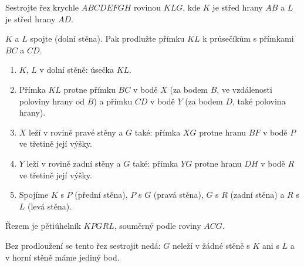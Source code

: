 \begin{problem}
  Sestrojte řez krychle $ABCDEFGH$ rovinou $KLG$, kde $K$ je střed hrany $AB$ a $L$ je střed hrany $AD$.
\end{problem}

\begin{hint}
  $K$ a $L$ spojte (dolní stěna). Pak prodlužte přímku $KL$ k průsečíkům s přímkami $BC$ a $CD$.
\end{hint}

\begin{solution}
  \begin{enumerate}
    \item $K$, $L$ v dolní stěně: úsečka $KL$.
    \item Přímka $KL$ protne přímku $BC$ v bodě $X$ (za bodem $B$, ve vzdálenosti poloviny hrany od $B$) a přímku $CD$ v bodě $Y$ (za bodem $D$, také polovina hrany).
    \item $X$ leží v rovině pravé stěny a $G$ také: přímka $XG$ protne hranu $BF$ v bodě $P$ ve třetině její výšky.
    \item $Y$ leží v rovině zadní stěny a $G$ také: přímka $YG$ protne hranu $DH$ v bodě $R$ ve třetině její výšky.
    \item Spojíme $K$ s $P$ (přední stěna), $P$ s $G$ (pravá stěna), $G$ s $R$ (zadní stěna) a $R$ s $L$ (levá stěna).
  \end{enumerate}
  Řezem je pětiúhelník $KPGRL$, souměrný podle roviny $ACG$.
  \begin{center}
  \end{center}
  Bez prodloužení se tento řez sestrojit nedá: $G$ neleží v žádné stěně s $K$ ani s $L$ a v horní stěně máme jediný bod.
\end{solution}

